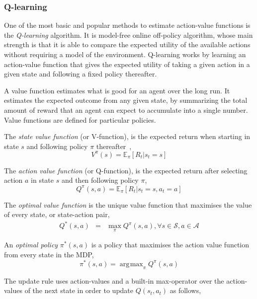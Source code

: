 \documentclass[a4paper]{article}
\DeclareMathOperator*{\argmax}{\arg\!\max}
\begin{document}
\subsubsection{Q-learning}

One of the most basic and popular methods to estimate action-value functions is the \emph{Q-learning} algorithm. It is model-free online off-policy algorithm, whose main strength is that it is able to compare the expected utility of the available actions without requiring a model of the environment. Q-learning works by learning an action-value function that gives the expected utility of taking a given action in a given state and following a fixed policy thereafter.

A value function estimates what is good for an agent over the long run. It estimates the expected outcome from any given state, by summarizing the total amount of reward that an agent can expect to accumulate into a single number. Value functions are defined for particular policies.

The \emph{state value function} (or V-function), is the expected return when starting in state $s$ and following policy $\pi$ thereafter~\citep{Sutton1998RL},
%
\begin{equation}
V^\pi(s) = \mathbb{E}_\pi \left[R_t | s_t = s \right]
\end{equation}

The \emph{action value function} (or Q-function), is the expected return after selecting action $a$ in state $s$ and then following policy $\pi$,
%
\begin{equation}
Q^\pi(s,a) = \mathbb{E}_\pi \left[ R_t | s_t = s, a_t = a \right]
\end{equation}

The \emph{optimal value function} is the unique value function that maximises the value of every state, or state-action pair,
%
\begin{eqnarray}
Q^*(s,a) & = & \max\limits_\pi Q^\pi(s,a), \forall s \in \mathcal{S}, a \in \mathcal{A}
\end{eqnarray}

An \emph{optimal policy} $\pi^*(s,a)$ is a policy that maximises the action value function from every state in the MDP,
%
\begin{equation}
    \pi^*(s,a) = \argmax_\pi Q^\pi(s, a)
\end{equation}

The update rule uses action-values and a built-in max-operator over the action-values of the next state in order to update $Q(s_t, a_t)$ as follows,
\end{document}
